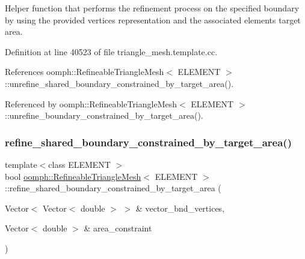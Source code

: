 Helper function that performs the refinement process on the specified boundary by using the provided vertices representation and the associated elements target area. 

Definition at line 40523 of file triangle\+\_\+mesh.\+template.\+cc.



References oomph\+::\+Refineable\+Triangle\+Mesh$<$ E\+L\+E\+M\+E\+N\+T $>$\+::unrefine\+\_\+shared\+\_\+boundary\+\_\+constrained\+\_\+by\+\_\+target\+\_\+area().



Referenced by oomph\+::\+Refineable\+Triangle\+Mesh$<$ E\+L\+E\+M\+E\+N\+T $>$\+::unrefine\+\_\+boundary\+\_\+constrained\+\_\+by\+\_\+target\+\_\+area().

\mbox{\label{classoomph_1_1RefineableTriangleMesh_adf7951948c93e9b0f259a7a05c15f1c5}} 
\subsubsection{\texorpdfstring{refine\+\_\+shared\+\_\+boundary\+\_\+constrained\+\_\+by\+\_\+target\+\_\+area()}{refine\_shared\_boundary\_constrained\_by\_target\_area()}}
{\footnotesize\ttfamily template$<$class E\+L\+E\+M\+E\+NT $>$ \\
bool \hyperlink{classoomph_1_1RefineableTriangleMesh}{oomph\+::\+Refineable\+Triangle\+Mesh}$<$ E\+L\+E\+M\+E\+NT $>$\+::refine\+\_\+shared\+\_\+boundary\+\_\+constrained\+\_\+by\+\_\+target\+\_\+area (\begin{DoxyParamCaption}\item[{Vector$<$ Vector$<$ double $>$ $>$ \&}]{vector\+\_\+bnd\+\_\+vertices,  }\item[{Vector$<$ double $>$ \&}]{area\+\_\+constraint }\end{DoxyParamCaption})\hspace{0.3cm}{\ttfamily [protected]}}




